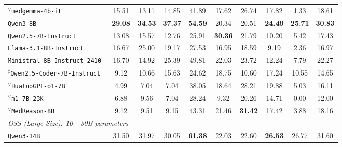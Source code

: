 \begin{table}[t]
{\begin{tabular}{l | c c c | c c | c c | c | c}
$^\vee$\texttt{medgemma-4b-it}~\citep{medgemma-hf} & 15.51& 13.11& 14.85& 41.89&17.62& 26.74 &17.82 &1.33& 18.61 \\
\texttt{Qwen3-8B}~\citep{qwen3} & \textbf{29.08}& \textbf{34.53}& \textbf{37.37}& \textbf{54.59}& 20.34&20.51&\textbf{24.49} & \textbf{25.71} & \textbf{30.83} \\
\texttt{Qwen2.5-7B-Instruct}~\citep{yang2024qwen2} & 13.08& 15.57& 12.76& 25.91& \textbf{30.36} &21.79& 10.20& 5.42& 17.43\\
\texttt{Llama-3.1-8B-Instruct}~\citep{dubey2024llama} & 16.67& 25.00&19.17 &27.53& 16.95& 18.59& 9.19& 2.36& 16.97\\
\texttt{Ministral-8B-Instruct-2410}~\citep{Ministral-8b} & 16.70& 14.92& 25.39& 49.81& 22.03& 23.72 &12.24 &7.79& 22.27\\
$^\ddagger$\texttt{Qwen2.5-Coder-7B-Instruct}~\citep{hui2024qwen2} & 9.12& 10.66 &15.63 &24.62 &18.75 &10.60 &17.24 &10.55 &14.65\\
$^\vee$\texttt{HuatuoGPT-o1-7B}~\citep{chen2024huatuogpt} & 4.99 & 7.04& 7.04 & 38.05 & 18.64 & 28.21 & 19.88& 5.03 & 16.11 \\
$^\vee$\texttt{m1-7B-23K}~\citep{huang2025m1} & 6.88& 9.56 &7.04 &28.24 &9.32& 20.26 &14.71 &0.00 & 12.00\\
$^\vee$\texttt{MedReason-8B}~\citep{wu2025medreason} & 9.12 & 9.51& 9.15& 43.31 & 21.46& \textbf{31.42}& 17.42& 3.88& 18.16\\
\midrule
\multicolumn{10}{l}{\textit{OSS (Large Size): 10 - 30B parameters}}  \\
\midrule
\texttt{Qwen3-14B}~\citep{qwen3} & 31.50 &31.97& 30.05& \textbf{61.38}& 22.03& 22.60 & \textbf{26.53} & {26.77}& 31.60 \\

\end{tabular}}
\end{table}

